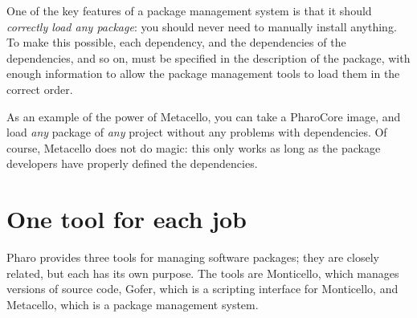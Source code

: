 \documentclass[a4paper,10pt,twoside]{book}
\begin{document}
One of the key features of a package management system is that it should \emph{correctly load any package}: you should never need to manually install anything.  To make this possible, each dependency, and the dependencies of the dependencies, and so on, must be specified in the description of the package, with enough information to allow the package management tools to load them in the correct order. 

As an example of the power of Metacello, you can take a PharoCore image, and load {\em any} package of {\em any} project without any problems with dependencies. Of course, Metacello does not do magic: this only works as long as the package developers have properly defined the dependencies.


\section{One tool for each job}

Pharo provides three tools for managing software packages; they are closely related, but each has its own purpose. The tools are Monticello, which manages versions of source code, Gofer, which is a scripting interface for Monticello, and Metacello, which is a package management system.


\end{document}
